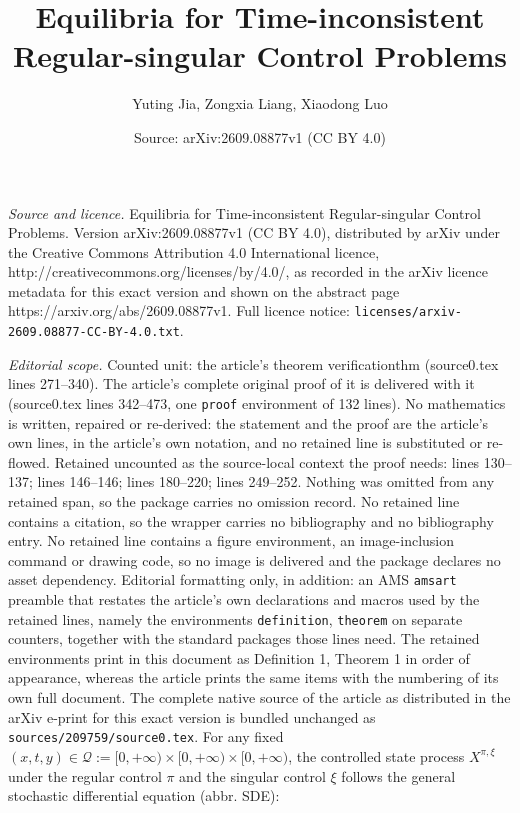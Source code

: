 \documentclass[10pt,a4paper]{amsart}
\title{Equilibria for Time-inconsistent Regular-singular Control Problems}
\author{Yuting Jia, Zongxia Liang, Xiaodong Luo}
\date{Source: arXiv:2609.08877v1 (CC BY 4.0)}
\begin{document}
\maketitle

\noindent\emph{Source and licence.} Equilibria for Time-inconsistent Regular-singular Control Problems. Version arXiv:2609.08877v1 (CC BY 4.0), distributed by arXiv under the Creative Commons Attribution 4.0 International licence, http://creativecommons.org/licenses/by/4.0/, as recorded in the arXiv licence metadata for this exact version and shown on the abstract page https://arxiv.org/abs/2609.08877v1. Full licence notice: \texttt{licenses/arxiv-2609.08877-CC-BY-4.0.txt}.\par\smallskip

\noindent\textit{Editorial scope.} Counted unit: the article's theorem verificationthm (source0.tex lines 271--340). The article's complete original proof of it is delivered with it (source0.tex lines 342--473, one \texttt{proof} environment of 132 lines). No mathematics is written, repaired or re-derived: the statement and the proof are the article's own lines, in the article's own notation, and no retained line is substituted or re-flowed.  Retained uncounted as the source-local context the proof needs: lines 130--137; lines 146--146; lines 180--220; lines 249--252.  Nothing was omitted from any retained span, so the package carries no omission record.  No retained line contains a citation, so the wrapper carries no bibliography and no bibliography entry.  No retained line contains a figure environment, an image-inclusion command or drawing code, so no image is delivered and the package declares no asset dependency.  Editorial formatting only, in addition: an AMS \texttt{amsart} preamble that restates the article's own declarations and macros used by the retained lines, namely the environments \texttt{definition}, \texttt{theorem} on separate counters, together with the standard packages those lines need.  The retained environments print in this document as Definition 1, Theorem 1 in order of appearance, whereas the article prints the same items with the numbering of its own full document.  The complete native source of the article as distributed in the arXiv e-print for this exact version is bundled unchanged as \texttt{sources/209759/source0.tex}.
For any fixed $(x,t,y)\in \mathcal{Q}:=[0,+\infty)\times[0,+\infty)\times[0,+\infty)$, the controlled state process $X^{\pi,\xi}$ under the regular control $\pi$ and the singular control $\xi$ follows the general stochastic differential equation (abbr. SDE):
\end{document}
